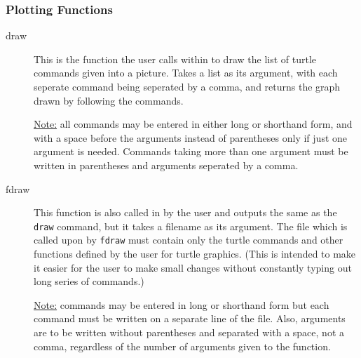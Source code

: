 \subsubsection{Plotting Functions}
\begin{description}
 \item[draw] This is the function the user calls within {\REDUCE} to
       draw the list of turtle commands given into a picture. Takes a list
       as its argument, with each seperate command being seperated by a
       comma, and returns the graph drawn by following the commands.

       \underline{Note:} all commands may be entered in either long or
                         shorthand form, and with a space
                         before the arguments instead of parentheses only
                         if just one argument is needed. Commands taking
                         more than one argument must be written in
                         parentheses and arguments seperated by a comma.
 \item[fdraw] This function is also called in {\REDUCE} by the user 
       and outputs the same as the \texttt{draw} command, but it takes a
       filename as its argument. The file which is called upon by \texttt{fdraw}
       must contain only the turtle commands and other functions
       defined by the user for turtle graphics. (This is intended to make
       it easier for the user to make small changes without constantly
       typing out long series of commands.)

       \underline{Note:} commands may be entered in long or shorthand form
                         but each command must be written on a separate
                         line of the file. Also, arguments are to be
                         written without parentheses and separated with a
                         space, not a comma, regardless of the number of
                         arguments given to the function.
\end{description}


